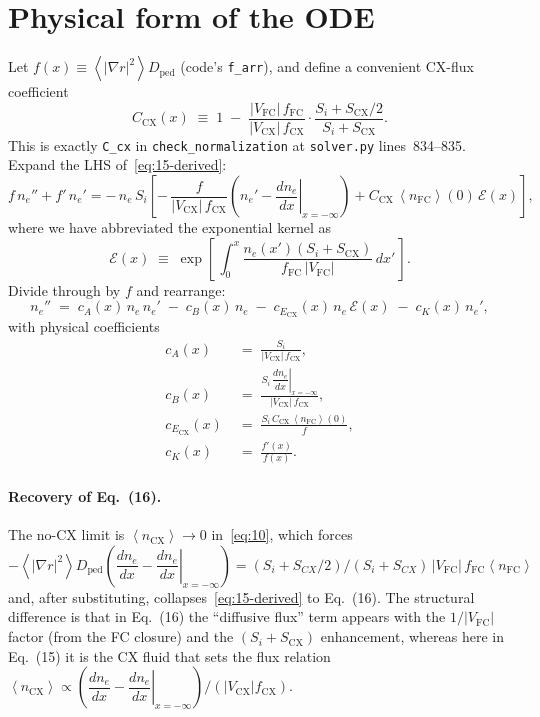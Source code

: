 \documentclass[11pt]{article}
\renewcommand{\ne}{n_{e}}  %
\newcommand{\nfc}{n_{\mathrm{FC}}}
\newcommand{\ncx}{n_{\mathrm{CX}}}
\newcommand{\Vfc}{\lvert V_{\mathrm{FC}}\rvert}
\newcommand{\Vcx}{\lvert V_{\mathrm{CX}}\rvert}
\newcommand{\Si}{S_{i}}
\newcommand{\Scx}{S_{\mathrm{CX}}}
\newcommand{\Dped}{D_{\mathrm{ped}}}
\newcommand{\fFC}{f_{\mathrm{FC}}}
\newcommand{\fCX}{f_{\mathrm{CX}}}
\newcommand{\fsa}[1]{\left\langle #1 \right\rangle}
\newcommand{\gradrsq}{\fsa{|\nabla r|^{2}}}
\newcommand{\neginf}{x=-\infty}
\newcommand{\dneneg}{\left.\dfrac{d\ne}{dx}\right|_{\neginf}}
\newcommand{\dnexnow}{\dfrac{d\ne}{dx}}
\newcommand{\nFCzero}{\fsa{\nfc}(0)}
\newcommand{\Afactor}{\Vfc\,\fFC}
\newcommand{\Ccx}{C_{\mathrm{CX}}}
\newcommand{\Ecx}{E_{\mathrm{CX}}}
\begin{document}
\section{Physical form of the ODE}
\label{sec:phys-ode}

Let $f(x)\equiv\gradrsq\Dped$ (code's \texttt{f\_arr}), and define a
convenient CX-flux coefficient
\begin{equation}
  \Ccx(x) \;\equiv\; 1 \;-\; \frac{\Vfc\,\fFC}{\Vcx\,\fCX}\cdot\frac{\Si+\Scx/2}{\Si+\Scx}.
  \label{eq:Ccx-def}
\end{equation}
This is exactly \texttt{C\_cx} in \texttt{check\_normalization} at
\texttt{solver.py} lines~834--835.  Expand the LHS of~\eqref{eq:15-derived}:
\begin{equation}
  f\,\ne'' + f'\,\ne'
    = -\,\ne\,\Si\!\left[
       -\,\frac{f}{\Vcx\,\fCX}(\ne'-\dneneg) + \Ccx\,\nFCzero\,\mathcal{E}(x)
       \right],
  \label{eq:phys-expand}
\end{equation}
where we have abbreviated the exponential kernel as
\begin{equation}
  \mathcal{E}(x) \;\equiv\; \exp\!\left[\,\int_{0}^{x}\frac{\ne(x')(\Si+\Scx)}{\fFC\,\Vfc}\,dx'\,\right].
  \label{eq:Eker-def}
\end{equation}
Divide through by $f$ and rearrange:
\begin{equation}
  \boxed{\;
    \ne'' \;=\; c_A(x)\,\ne\,\ne'
         \;-\; c_B(x)\,\ne
         \;-\; c_{\Ecx}(x)\,\ne\,\mathcal{E}(x)
         \;-\; c_K(x)\,\ne',
  \;}
  \label{eq:phys-ODE}
\end{equation}
with physical coefficients
\begin{align}
  c_A(x)    &\;=\; \frac{\Si}{\Vcx\,\fCX}, \label{eq:cA}\\
  c_B(x)    &\;=\; \frac{\Si\,\dneneg}{\Vcx\,\fCX}, \label{eq:cB}\\
  c_{\Ecx}(x) &\;=\; \frac{\Si\,\Ccx\,\nFCzero}{f}, \label{eq:cEcx}\\
  c_K(x)    &\;=\; \frac{f'(x)}{f(x)}. \label{eq:cK}
\end{align}

\paragraph{Recovery of Eq.~(16).}
The no-CX limit is $\fsa{\ncx}\to 0$ in~\eqref{eq:10}, which forces
$-\gradrsq\Dped(\dnexnow-\dneneg)=(S_i+S_{CX}/2)/(S_i+S_{CX})\,\Afactor\fsa{\nfc}$
and, after substituting, collapses~\eqref{eq:15-derived} to
Eq.~(16).  The structural difference is that in Eq.~(16) the ``diffusive
flux'' term appears with the $1/\Vfc$ factor (from the FC closure) and
the $(S_i+\Scx)$ enhancement, whereas here in Eq.~(15) it is the CX
fluid that sets the flux relation $\fsa{\ncx}\propto
(\dnexnow-\dneneg)/(\Vcx\fCX)$.
\end{document}
